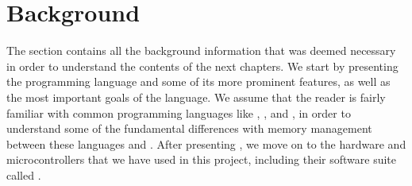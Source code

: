 
\chapter{Background}
\label{chap:background}

The section contains all the background information that was deemed necessary in order to understand the contents of the next chapters.
We start by presenting the {\rust} programming language and some of its more prominent features, as well as the most important goals of the language.
We assume that the reader is fairly familiar with common programming languages like {\Java}, {\C}, and {\Cpp}, in order to understand some of the fundamental differences with memory management between these languages and {\rust}.
After presenting {\rust}, we move on to the hardware and microcontrollers that we have used in this project, including their software suite called \emlib.







% 
% 
% 
